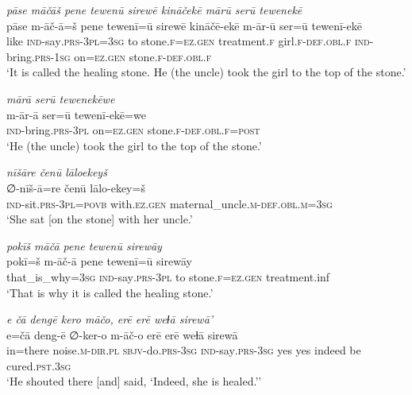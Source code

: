 \ea \label{ZP.52}
\textit{pāse māčāš pene tewenū sirewē kināčekē mārū serū tewenekē} \\ 
\gll pāse m-āč-ā=š pene tewenī=ū sirewē kināčē-ekē m-ār-ū ser=ū tewenī-ekē \\ 
 like \textsc{ind-}say\textsc{.prs}\textsc{-3pl}\textsc{=3sg} to stone\textsc{.f}\textsc{\textsc{=ez.gen}} treatment\textsc{.f} girl\textsc{.f}\textsc{-def}\textsc{.obl}\textsc{.f} \textsc{ind-}bring\textsc{.prs}\textsc{-\textsc{1sg}} on\textsc{\textsc{=ez.gen}} stone\textsc{.f}\textsc{-def}\textsc{.obl}\textsc{.f} \\ 
\glt `It is called the healing stone. He (the uncle) took the girl to the top of the stone.'
\z 
 
\ea \label{ZP.55}
\textit{mārā serū tewenekēwe} \\ 
\gll m-ār-ā ser=ū tewenī-ekē=we \\ 
 \textsc{ind-}bring\textsc{.prs}\textsc{-3pl} on\textsc{\textsc{=ez.gen}} stone\textsc{.f}\textsc{-def}\textsc{.obl}\textsc{.f}\textsc{=\textsc{post}} \\ 
\glt `He (the uncle) took the girl to the top of the stone.'
\z 
 
\ea \label{ZP.56}
\textit{nīšāre čenū lāloekeyš} \\ 
\gll ∅-nīš-ā=re čenū lālo-ekey=š \\ 
 \textsc{ind-}sit\textsc{.prs}\textsc{-3pl}\textsc{=\textsc{povb}} with\textsc{.ez.gen} maternal\_uncle\textsc{.m}\textsc{-def}\textsc{.obl}\textsc{.m}\textsc{=3sg} \\ 
\glt `She sat [on the stone] with her uncle.'
\z 
 
\ea \label{ZP.59}
\textit{pokīš māčā pene tewenū sirewāy} \\ 
\gll pokī=š m-āč-ā pene tewenī=ū sirewāy \\ 
 that\_is\_why\textsc{=3sg} \textsc{ind-}say\textsc{.prs}\textsc{-3pl} to stone\textsc{.f}\textsc{\textsc{=ez.gen}} treatment.inf \\ 
\glt `That is why it is called the healing stone.'
\z 
 
\ea \label{ZP.60}
\textit{e čā dengē kero māčo, erē erē weɫā sirewā’} \\ 
\gll e=čā deng-ē ∅-ker-o m-āč-o erē erē weɫā sirewā \\ 
 in=there noise\textsc{.m}\textsc{-dir}\textsc{.pl} \textsc{sbjv-}do\textsc{.prs}\textsc{-3sg} \textsc{ind-}say\textsc{.prs}\textsc{-3sg} yes yes indeed be cured\textsc{.pst}\textsc{.3sg} \\ 
\glt `He shouted there [and] said, ‘Indeed, she is healed.’'
\z 
 
